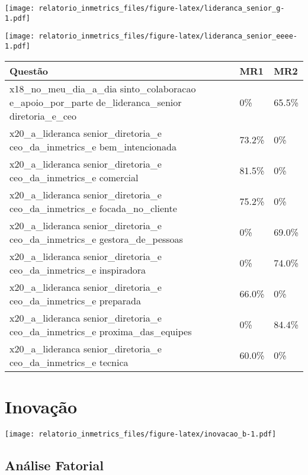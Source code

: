 \documentclass[]{book}
\begin{document}
\texttt{[image: relatorio\_inmetrics\_files/figure-latex/lideranca\_senior\_g-1.pdf]}

\texttt{[image: relatorio\_inmetrics\_files/figure-latex/lideranca\_senior\_eeee-1.pdf]}

\begin{table}[H]
\centering\begingroup\fontsize{12}{14}\selectfont

\begin{tabular}{>{\raggedright\arraybackslash}p{20em}ll}
\toprule
Questão & MR1 & MR2\\
\midrule
x18\_no\_meu\_dia\_a\_dia
sinto\_colaboracao
e\_apoio\_por\_parte
de\_lideranca\_senior
diretoria\_e\_ceo & 0\% & 65.5\%\\
x20\_a\_lideranca
senior\_diretoria\_e
ceo\_da\_inmetrics\_e
bem\_intencionada & 73.2\% & 0\%\\
x20\_a\_lideranca
senior\_diretoria\_e
ceo\_da\_inmetrics\_e
comercial & 81.5\% & 0\%\\
x20\_a\_lideranca
senior\_diretoria\_e
ceo\_da\_inmetrics\_e
focada\_no\_cliente & 75.2\% & 0\%\\
x20\_a\_lideranca
senior\_diretoria\_e
ceo\_da\_inmetrics\_e
gestora\_de\_pessoas & 0\% & 69.0\%\\
\addlinespace
x20\_a\_lideranca
senior\_diretoria\_e
ceo\_da\_inmetrics\_e
inspiradora & 0\% & 74.0\%\\
x20\_a\_lideranca
senior\_diretoria\_e
ceo\_da\_inmetrics\_e
preparada & 66.0\% & 0\%\\
x20\_a\_lideranca
senior\_diretoria\_e
ceo\_da\_inmetrics\_e
proxima\_das\_equipes & 0\% & 84.4\%\\
x20\_a\_lideranca
senior\_diretoria\_e
ceo\_da\_inmetrics\_e
tecnica & 60.0\% & 0\%\\
\bottomrule
\end{tabular}
\endgroup{}
\end{table}

\hypertarget{inovacao}{%
\section{Inovação}\label{inovacao}}

\texttt{[image: relatorio\_inmetrics\_files/figure-latex/inovacao\_b-1.pdf]}

\hypertarget{analise-fatorial-11}{%
\subsection{Análise Fatorial}\label{analise-fatorial-11}}
\end{document}
